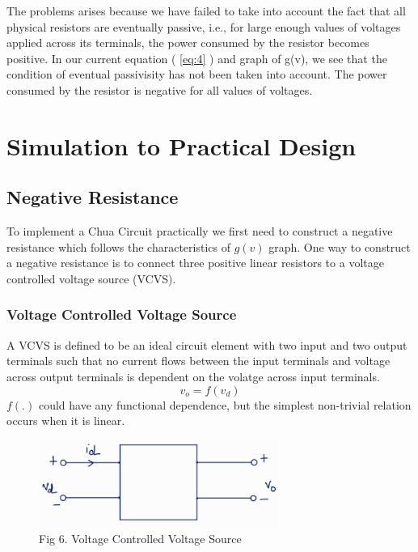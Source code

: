 \documentclass[12pt]{article}
\newcommand*{\myref}[1]{%
  \begingroup
    \hypersetup{
      linkcolor=linkequation,
      linkbordercolor=linkequation,
    }%
    \ref{#1}%
  \endgroup
}
\begin{document}
The problems arises because we have failed to take into account the fact that all physical resistors are eventually passive, i.e., for large enough values of voltages applied across its terminals, the power consumed by the resistor becomes positive. \linebreak
In our current equation (\myref{eq:4}) and graph of g(v), we see that the condition of eventual passivisity has not been taken into account. The power consumed by the resistor is negative for all values of voltages.
\section{Simulation to Practical Design}
\subsection{Negative Resistance}
To implement a Chua Circuit practically we first need to construct a negative resistance which follows the characteristics of $g(v)$ graph. One way to construct a negative resistance is to connect three positive linear resistors to a voltage controlled voltage source (VCVS).
%
\subsubsection{Voltage Controlled Voltage Source}
A VCVS is defined to be an ideal circuit element with two input and two output terminals such that no current flows between the input terminals and voltage across output terminals is dependent on the volatge across input terminals.
\[ v_o= f(v_d) \]
$f(.)$ could have any functional dependence, but the simplest non-trivial relation occurs when it is linear. 
\begin{figure}[H]
	\centering
	\includegraphics[width=0.7\textwidth]{Images/fig6_vcvs.png}
	\caption{Fig 6. Voltage Controlled Voltage Source}
\end{figure} 
%
\end{document}
